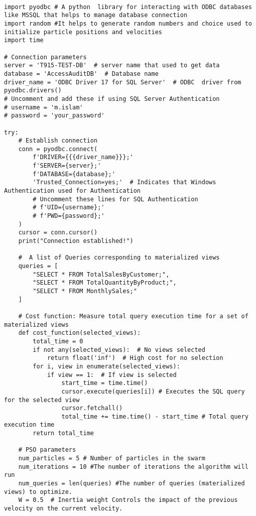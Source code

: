 \begin{lstlisting}[style=pythonstyle, label={lst:example} caption={Python Code Example}]

import pyodbc # A python  library for interacting with ODBC databases like MSSQL that helps to manage database connection
import random #It helps to generate random numbers and choice used to initialize particle positions and velocities
import time

# Connection parameters
server = 'T915-TEST-DB'  # server name that used to get data 
database = 'AccessAuditDB'  # Database name
driver_name = 'ODBC Driver 17 for SQL Server'  # ODBC  driver from pyodbc.drivers()
# Uncomment and add these if using SQL Server Authentication
# username = 'm.islam'
# password = 'your_password'

try:
    # Establish connection
    conn = pyodbc.connect(
        f'DRIVER={{{driver_name}}};'
        f'SERVER={server};'
        f'DATABASE={database};'
        'Trusted_Connection=yes;'  # Indicates that Windows Authentication used for Authentication
        # Uncomment these lines for SQL Authentication
        # f'UID={username};'
        # f'PWD={password};'
    )
    cursor = conn.cursor()
    print("Connection established!")

    #  A list of Queries corresponding to materialized views
    queries = [
        "SELECT * FROM TotalSalesByCustomer;",
        "SELECT * FROM TotalQuantityByProduct;",
        "SELECT * FROM MonthlySales;"
    ]

    # Cost function: Measure total query execution time for a set of materialized views 
    def cost_function(selected_views):
        total_time = 0
        if not any(selected_views):  # No views selected
            return float('inf')  # High cost for no selection
        for i, view in enumerate(selected_views):
            if view == 1:  # If view is selected
                start_time = time.time()
                cursor.execute(queries[i]) # Executes the SQL query for the selected view
                cursor.fetchall()
                total_time += time.time() - start_time # Total query execution time 
        return total_time

    # PSO parameters
    num_particles = 5 # Number of particles in the swarm 
    num_iterations = 10 #The number of iterations the algorithm will run
    num_queries = len(queries) #The number of queries (materialized views) to optimize.
    W = 0.5  # Inertia weight Controls the impact of the previous velocity on the current velocity.


\end{lstlisting}
